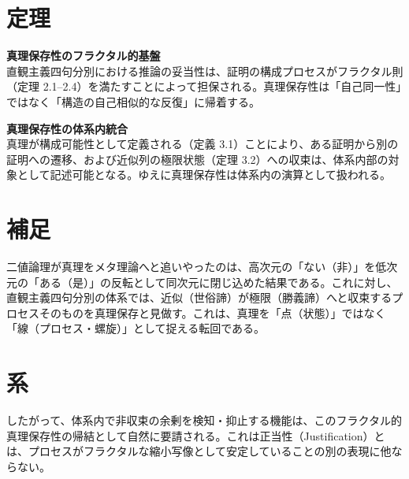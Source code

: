 \documentclass[11pt,a4paper]{article}
\begin{document}
\section{定理}

\begin{description}[style=multiline, leftmargin=4.5cm]
  \item[定理 4.1] \textbf{真理保存性のフラクタル的基盤}\\
  直観主義四句分別における推論の妥当性は、証明の構成プロセスがフラクタル則（定理 2.1--2.4）を満たすことによって担保される。真理保存性は「自己同一性」ではなく「構造の自己相似的な反復」に帰着する。
  
  \item[定理 4.2] \textbf{真理保存性の体系内統合}\\
  真理が構成可能性として定義される（定義 3.1）ことにより、ある証明から別の証明への遷移、および近似列の極限状態（定理 3.2）への収束は、体系内部の対象として記述可能となる。ゆえに真理保存性は体系内の演算として扱われる。
\end{description}

\section{補足}
二値論理が真理をメタ理論へと追いやったのは、高次元の「ない（非）」を低次元の「ある（是）」の反転として同次元に閉じ込めた結果である。これに対し、直観主義四句分別の体系では、近似（世俗諦）が極限（勝義諦）へと収束するプロセスそのものを真理保存と見做す。これは、真理を「点（状態）」ではなく「線（プロセス・螺旋）」として捉える転回である。

\section{系}
したがって、体系内で非収束の余剰を検知・抑止する機能は、このフラクタル的真理保存性の帰結として自然に要請される。これは正当性（Justification）とは、プロセスがフラクタルな縮小写像として安定していることの別の表現に他ならない。
\end{document}
